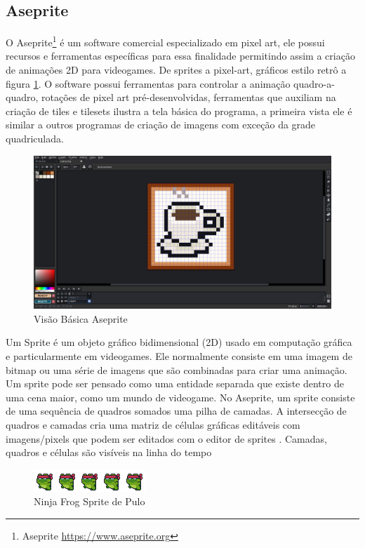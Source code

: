 \newpage
\subsection{Aseprite}  
\label{sec:aseprite}
O Aseprite\footnote{Aseprite \url{https://www.aseprite.org}} é um software comercial especializado em pixel art, ele possui recursos e ferramentas específicas para essa finalidade permitindo assim a criação de animações 2D para videogames. De sprites a pixel-art, gráficos estilo retrô a figura \ref{fig:aseprite}. O software possui ferramentas para controlar
a animação quadro-a-quadro, rotações de pixel art pré-desenvolvidas, ferramentas que auxiliam na criação de tiles e tilesets
ilustra a tela básica do programa, a primeira vista ele é similar a outros programas de criação de imagens com exceção da grade quadriculada.  
\begin{figure}[ht!]
    \centering
    \includegraphics[width=1\linewidth]{figuras/aseprite.jpg}
    \caption{Visão Básica Aseprite}
    \label{fig:aseprite}
\end{figure}

Um Sprite é um objeto gráfico bidimensional (2D) usado em computação gráfica e particularmente em videogames. Ele normalmente consiste em uma imagem de bitmap ou uma série de imagens que são combinadas para criar uma animação. Um sprite pode ser pensado como uma entidade separada que existe dentro de uma cena maior, como um mundo de videogame. No Aseprite, um sprite consiste de uma sequência de quadros somados uma pilha de camadas. A intersecção de quadros e camadas cria uma matriz de células gráficas editáveis com imagens/pixels que podem ser editados com o editor de sprites . Camadas, quadros e células são visíveis na linha do tempo
\begin{figure}[h!]
    \centering
    \includegraphics[width=1\linewidth]{figuras/sprite-frog.png}
    \caption{Ninja Frog Sprite de Pulo}
    \label{fig:enter-label}
\end{figure}
